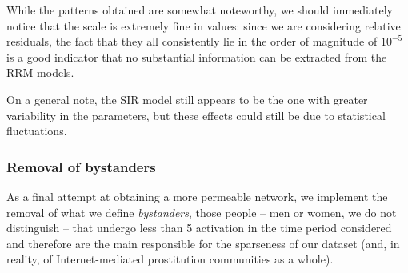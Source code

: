 \documentclass[a4paper,11pt, twocolumn]{article}
\begin{document}
While the patterns obtained are somewhat noteworthy, we should immediately notice that the scale is extremely fine in values: since we are considering relative residuals, the fact that they all consistently lie in the order of magnitude of $10^{-5}$ is a good indicator that no substantial information can be extracted from the RRM models.

On a general note, the SIR model still appears to be the one with greater variability in the parameters, but these effects could still be due to statistical fluctuations.


\subsubsection*{Removal of bystanders}
As a final attempt at obtaining a more permeable network, we implement the removal of what we define \emph{bystanders}, those people -- men or women, we do not distinguish -- that undergo less than 5 activation in the time period considered and therefore are the main responsible for the sparseness of our dataset (and, in reality, of Internet-mediated prostitution communities as a whole).
\end{document}
